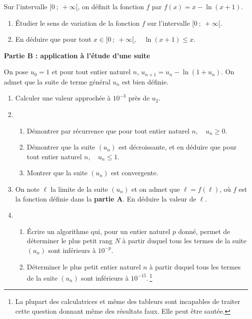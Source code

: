 \documentclass[10pt]{article}
\begin{document}
Sur l'intervalle $[0~;~ +\infty[$, on définit la fonction $f$ par $f(x) = x - \ln(x + 1)$.
\begin{enumerate}
	\item Étudier le sens de variation de la fonction $f$ sur l'intervalle $[0~;~ +\infty[$.	
	\item En déduire que pour tout $x \in [0~;~ +\infty[, \quad \ln(x + 1) \leqslant x$.
\end{enumerate}

\bigskip

\textbf{Partie B : application à l'étude d'une suite}

On pose $u_0 = 1$ et pour tout entier naturel $n$, $u_{n+1} = u_n - \ln(1 + u_n)$. On admet que la suite de terme général $u_n$ est bien définie.

\begin{enumerate}
\item Calculer une valeur approchée à $10^{-3}$ près de $u_2$.	
\item 
		\begin{enumerate}
			\item Démontrer par récurrence que pour tout entier naturel $n, \quad u_n \geqslant 0$.		
			\item Démontrer que la suite $(u_n)$ est décroissante, et en déduire que pour tout entier naturel $n, \quad u_n \leqslant 1 $.			
			\item Montrer que la suite $(u_n)$ est convergente.
	\end{enumerate}
\item On note $\ell$ la limite de la suite $(u_n)$ et on admet que $\ell = f(\ell)$, où $f$ est la fonction définie dans la \textbf{partie A}. En déduire la valeur de $\ell$.
\item 
\begin{enumerate}
		\item Écrire un algorithme qui, pour un entier naturel $p$ donné, permet de déterminer le plus petit rang $N$ à partir duquel tous les termes de la suite $\left(u_n\right)$ sont inférieurs à $10^{-p}$.		
		\item Déterminer le plus petit entier naturel $n$ à partir duquel tous les termes de la suite $\left(u_n\right)$ sont inférieurs à $10^{-15}.\,$\footnote{La plupart des calculatrices et même des tableurs sont incapables de traiter cette question donnant même des résultats faux. Elle peut être sautée.}
	\end{enumerate}
\end{enumerate}
\end{document}
